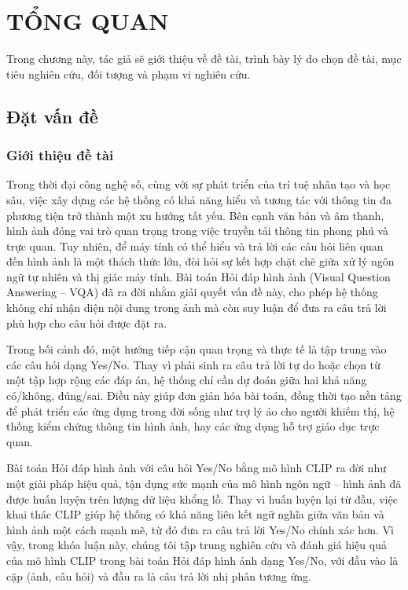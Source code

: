 \chapter{TỔNG QUAN}
\label{chap:chap1-introduce}
\nocite{*}
Trong chương này, tác giả sẽ giới thiệu về đề tài, trình bày lý do chọn đề tài, mục tiêu nghiên cứu, đối tượng và phạm vi nghiên cứu.

\section{Đặt vấn đề}
\subsection{Giới thiệu đề tài}
Trong thời đại công nghệ số, cùng với sự phát triển của trí tuệ nhân tạo và học sâu, việc xây dựng các hệ thống có khả năng hiểu và tương tác với thông tin đa phương tiện trở thành một xu hướng tất yếu. Bên cạnh văn bản và âm thanh, hình ảnh đóng vai trò quan trọng trong việc truyền tải thông tin phong phú và trực quan. Tuy nhiên, để máy tính có thể hiểu và trả lời các câu hỏi liên quan đến hình ảnh là một thách thức lớn, đòi hỏi sự kết hợp chặt chẽ giữa xử lý ngôn ngữ tự nhiên và thị giác máy tính. Bài toán Hỏi đáp hình ảnh (Visual Question Answering – VQA) đã ra đời nhằm giải quyết vấn đề này, cho phép hệ thống không chỉ nhận diện nội dung trong ảnh mà còn suy luận để đưa ra câu trả lời phù hợp cho câu hỏi được đặt ra.

Trong bối cảnh đó, một hướng tiếp cận quan trọng và thực tế là tập trung vào các câu hỏi dạng Yes/No. Thay vì phải sinh ra câu trả lời tự do hoặc chọn từ một tập hợp rộng các đáp án, hệ thống chỉ cần dự đoán giữa hai khả năng có/không, đúng/sai. Điều này giúp đơn giản hóa bài toán, đồng thời tạo nền tảng để phát triển các ứng dụng trong đời sống như trợ lý ảo cho người khiếm thị, hệ thống kiểm chứng thông tin hình ảnh, hay các ứng dụng hỗ trợ giáo dục trực quan.

Bài toán Hỏi đáp hình ảnh với câu hỏi Yes/No bằng mô hình CLIP ra đời như một giải pháp hiệu quả, tận dụng sức mạnh của mô hình ngôn ngữ – hình ảnh đã được huấn luyện trên lượng dữ liệu khổng lồ. Thay vì huấn luyện lại từ đầu, việc khai thác CLIP giúp hệ thống có khả năng liên kết ngữ nghĩa giữa văn bản và hình ảnh một cách mạnh mẽ, từ đó đưa ra câu trả lời Yes/No chính xác hơn. Vì vậy, trong khóa luận này, chúng tôi tập trung nghiên cứu và đánh giá hiệu quả của mô hình CLIP trong bài toán Hỏi đáp hình ảnh dạng Yes/No, với đầu vào là cặp (ảnh, câu hỏi) và đầu ra là câu trả lời nhị phân tương ứng. 


